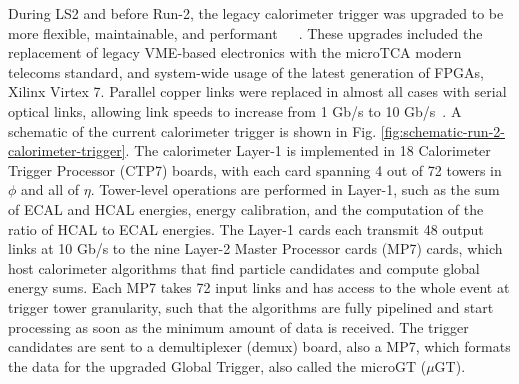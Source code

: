 During LS2 and before Run-2, the legacy calorimeter trigger was upgraded to be more flexible, maintainable, and performant~\cite{CMS-CR-2016-303}~\cite{JINST_Level-1-Calo-Trigger_2017}~\cite{Klabbers:2013cka}. These upgrades included the replacement of legacy VME-based electronics with the microTCA modern telecoms standard, and system-wide usage of the latest generation of FPGAs, Xilinx Virtex 7. Parallel copper links were replaced in almost all cases with serial optical links, allowing link speeds to increase from 1 Gb/s to 10 Gb/s~\cite{CMS-CR-2016-303}. A schematic of the current calorimeter trigger is shown in Fig. \ref{fig:schematic-run-2-calorimeter-trigger}. The calorimeter Layer-1 is implemented in 18 Calorimeter Trigger Processor (CTP7) boards, with each card spanning 4 out of 72 towers in $\phi$ and all of $\eta$. Tower-level operations are performed in Layer-1, such as the sum of ECAL and HCAL energies, energy calibration, and the computation of the ratio of HCAL to ECAL energies. The Layer-1 cards each transmit 48 output links at 10 Gb/s to the nine Layer-2 Master Processor cards (MP7) cards, which host calorimeter algorithms that find particle candidates and compute global energy sums. Each MP7 takes 72 input links and has access to the whole event at trigger tower granularity, such that the algorithms are fully pipelined and start processing as soon as the minimum amount of data is received. The trigger candidates are sent to a demultiplexer (demux) board, also a MP7, which formats the data for the upgraded Global Trigger, also called the microGT ($\mu$GT). 

